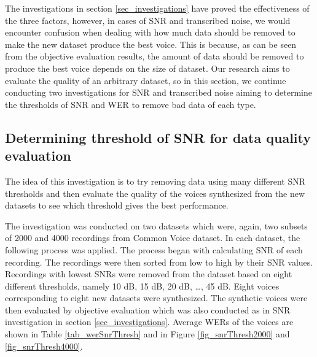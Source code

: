 \documentclass[12pt]{article}
\begin{document}
The investigations in section \ref{sec_investigations} have proved the effectiveness of the three factors, however, in cases of SNR and transcribed noise, we would encounter confusion when dealing with how much data should be removed to make the new dataset produce the best voice. This is because, as can be seen from the objective evaluation results, the amount of data should be removed to produce the best voice depends on the size of dataset. Our research aims to evaluate the quality of an arbitrary dataset, so in this section, we continue conducting two investigations for SNR and transcribed noise aiming to determine the thresholds of SNR and WER to remove bad data of each type.

\subsection{Determining threshold of SNR for data quality evaluation}
The idea of this investigation is to try removing data using many different SNR thresholds and then evaluate the quality of the voices synthesized from the new datasets to see which threshold gives the best performance.

The investigation was conducted on two datasets which were, again, two subsets of 2000 and 4000 recordings from Common Voice dataset. In each dataset, the following process was applied. The process began with calculating SNR of each recording. The recordings were then sorted from low to high by their SNR values. Recordings with lowest SNRs were removed from the dataset based on eight different thresholds, namely 10 dB, 15 dB, 20 dB, …, 45 dB. Eight voices corresponding to eight new datasets were synthesized. The synthetic voices were then evaluated by objective evaluation which was also conducted as in SNR investigation in section \ref{sec_investigations}. Average WERs of the voices are shown in Table \ref{tab_werSnrThresh} and in Figure \ref{fig_snrThresh2000} and \ref{fig_snrThresh4000}.
\end{document}
